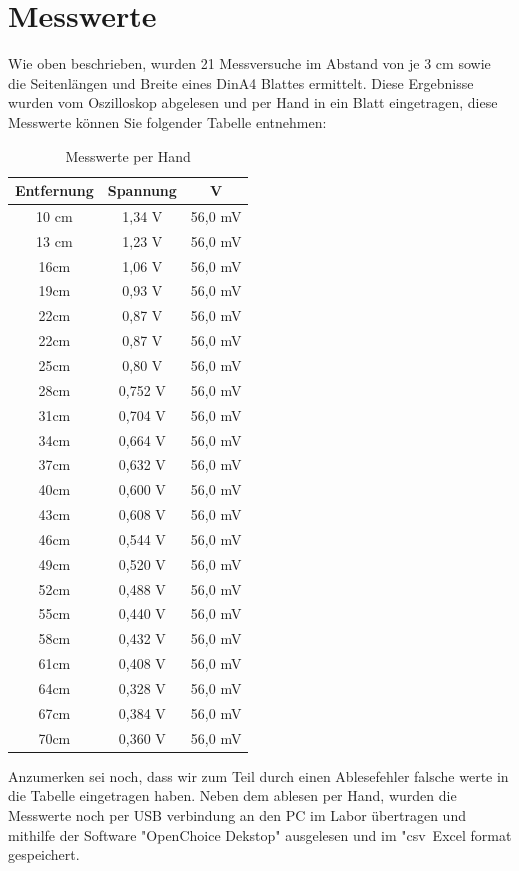 \documentclass[TGAI_Laborbericht.tex]{subfiles}
\begin{document}
\section{Messwerte}
\label{chap:VERSUCH_1_MESSWERTE}
\begin{flushleft}
Wie oben beschrieben, wurden 21 Messversuche im Abstand von je 3 cm sowie die
Seitenlängen und Breite eines DinA4 Blattes ermittelt. Diese Ergebnisse wurden vom
Oszilloskop abgelesen und per Hand in ein Blatt eingetragen, diese Messwerte können Sie
folgender Tabelle entnehmen:
\begin{table}[H]
\begin{tabular}{|c|c|c|}
Entfernung & Spannung & V \\ 
\hline 
10 cm & 1,34 V & 56,0 mV \\ 
\hline 
13 cm & 1,23 V & 56,0 mV \\ 
\hline 
16cm & 1,06 V & 56,0 mV \\ 
\hline 
19cm & 0,93 V & 56,0 mV \\
\hline 
22cm & 0,87 V & 56,0 mV \\
\hline 
22cm & 0,87 V & 56,0 mV \\
\hline 
25cm & 0,80 V & 56,0 mV \\ 
\hline 
28cm & 0,752 V & 56,0 mV \\
\hline
31cm & 0,704 V & 56,0 mV \\
\hline
34cm & 0,664 V & 56,0 mV \\
\hline
37cm & 0,632 V & 56,0 mV \\
\hline
40cm & 0,600 V & 56,0 mV \\
\hline
43cm & 0,608 V & 56,0 mV \\
\hline
46cm & 0,544 V & 56,0 mV \\
\hline
49cm & 0,520 V & 56,0 mV \\
\hline
52cm & 0,488 V & 56,0 mV \\
\hline
55cm & 0,440 V & 56,0 mV \\
\hline
58cm & 0,432 V & 56,0 mV \\
\hline
61cm & 0,408 V & 56,0 mV \\
\hline
64cm & 0,328 V & 56,0 mV \\
\hline
67cm & 0,384 V & 56,0 mV \\
\hline
70cm & 0,360 V & 56,0 mV \\
\hline
\end{tabular}
\label{Messwerte per Hand}
\caption{Messwerte per Hand} 
\end{table}
	

	
	



Anzumerken sei noch, dass wir zum Teil durch einen Ablesefehler falsche werte in die Tabelle eingetragen haben.
Neben dem ablesen per Hand, wurden die Messwerte noch per USB verbindung an den PC im Labor übertragen und mithilfe der Software "OpenChoice Dekstop" ausgelesen und im "csv\dq ~Excel format gespeichert. 
\end{flushleft}
\end{document}
